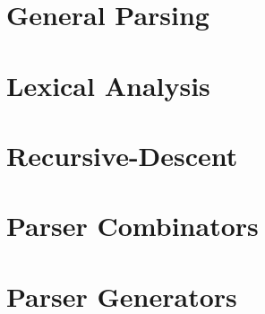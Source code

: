 \section{General Parsing}
\section{Lexical Analysis}
\section{Recursive-Descent}
\section{Parser Combinators}
\section{Parser Generators}

